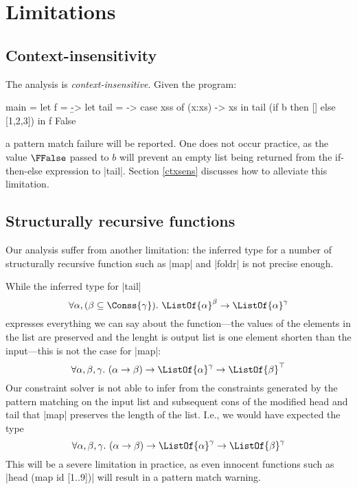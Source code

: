 \section{Limitations}

\subsection{Context-insensitivity}

The analysis is \emph{context-insensitive}. Given the program:

\begin{code}
main =  let f = \b ->  let tail = \xss -> case  xss of
                                                (x:xs) -> xs
                       in tail (if b then [] else [1,2,3])
         in f False
\end{code}
a pattern match failure will be reported. One does not occur practice, as the value $\FFalse$ passed to $b$ will prevent an empty list being returned from the if-then-else expression to |tail|. Section \ref{ctxsens} discusses how to alleviate this limitation.

\subsection{Structurally recursive functions}

Our analysis suffer from another limitation: the inferred type for a number of structurally recursive function such as |map| and |foldr| is not precise enough.

While the inferred type for |tail|
\[ \forall \alpha, (\beta \subseteq \Conss{\gamma}).\ \ListOf{\alpha}^\beta \to \ListOf{\alpha}^\gamma \]
expresses everything we can say about the function---the values of the elements in the list are preserved and the lenght is output list is one element shorten than the input---this is not the case for |map|:
\[ \forall \alpha, \beta, \gamma.\ (\alpha \to \beta) \to \ListOf{\alpha}^\gamma \to \ListOf{\beta}^\top \]
Our constraint solver is not able to infer from the constraints generated by the pattern matching on the input list and subsequent cons of the modified head and tail that |map| preserves the length of the list. I.e., we would have expected the type
\[ \forall \alpha, \beta, \gamma.\ (\alpha \to \beta) \to \ListOf{\alpha}^\gamma \to \ListOf{\beta}^\gamma \]
This will be a severe limitation in practice, as even innocent functions such as |head (map id [1..9])| will result in a pattern match warning.
